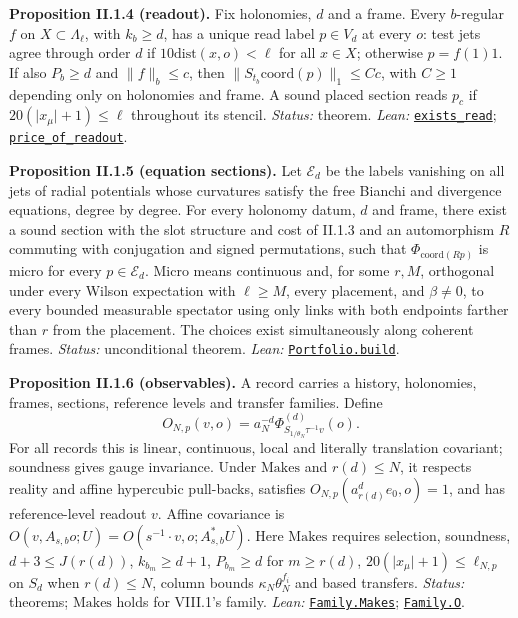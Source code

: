 \documentclass[
  letterpaper,
  11pt]{article}
\begin{document}
\textbf{Proposition II.1.4 (readout).} Fix holonomies, \(d\) and a
frame. Every \(b\)-regular \(f\) on \(X\subset\Lambda_\ell\), with
\(k_b\ge d\), has a unique read label \(p\in V_d\) at every \(o\): test
jets agree through order \(d\) if \(10\mathrm{dist}(x,o)<\ell\) for all
\(x\in X\); otherwise \(p=f(1)1\). If also \(P_b\ge d\) and
\(\lVert f\rVert_b\le c\), then
\(\lVert S_{t_b}\mathrm{coord}(p)\rVert_1\le Cc\), with \(C\ge1\)
depending only on holonomies and frame. A sound placed section reads
\(p_c\) if \(20(\lvert x_\mu\rvert+1)\le\ell\) throughout its stencil.
\emph{Status:} theorem. \emph{Lean:}
\href{https://github.com/yang-mills-group/OpenAI-YM-20261028/blob/3456e5e75cf8d4cd558955a5c7638fba2d68f464/YM/Next/FOUNDATIONS/Readout.lean\#L238-L247}{\texttt{exists\_read}};
\href{https://github.com/yang-mills-group/OpenAI-YM-20261028/blob/3456e5e75cf8d4cd558955a5c7638fba2d68f464/YM/Next/FOUNDATIONS/TestBounds.lean\#L271-L290}{\texttt{price\_of\_readout}}.

\textbf{Proposition II.1.5 (equation sections).} Let \(\mathcal E_d\) be
the labels vanishing on all jets of radial potentials whose curvatures
satisfy the free Bianchi and divergence equations, degree by degree. For
every holonomy datum, \(d\) and frame, there exist a sound section with
the slot structure and cost of II.1.3 and an automorphism \(R\)
commuting with conjugation and signed permutations, such that
\(\Phi_{\mathrm{coord}(Rp)}\) is micro for every \(p\in\mathcal E_d\).
Micro means continuous and, for some \(r,M\), orthogonal under every
Wilson expectation with \(\ell\ge M\), every placement, and
\(\beta\ne0\), to every bounded measurable spectator using only links
with both endpoints farther than \(r\) from the placement. The choices
exist simultaneously along coherent frames. \emph{Status:} unconditional
theorem. \emph{Lean:}
\href{https://github.com/yang-mills-group/OpenAI-YM-20261028/blob/3456e5e75cf8d4cd558955a5c7638fba2d68f464/YM/Push/RELAY_MARK/Portfolio.lean\#L101-L105}{\texttt{Portfolio.build}}.

\textbf{Proposition II.1.6 (observables).} A record carries a history,
holonomies, frames, sections, reference levels and transfer families.
Define
\[O_{N,p}(v,o)=a_N^{-d}\Phi^{(d)}_{S_{1/\theta_N}\tau^{-1}v}(o).\] For
all records this is linear, continuous, local and literally translation
covariant; soundness gives gauge invariance. Under \(\mathrm{Makes}\)
and \(r(d)\le N\), it respects reality and affine hypercubic pull-backs,
satisfies \(O_{N,p}(a_{r(d)}^de_0,o)=1\), and has reference-level
readout \(v\). Affine covariance is
\(O(v,A_{s,b}o;U)=O(s^{-1}\cdot v,o;A_{s,b}^*U)\). Here
\(\mathrm{Makes}\) requires selection, soundness, \(d+3\le J(r(d))\),
\(k_{b_m}\ge d+1\), \(P_{b_m}\ge d\) for \(m\ge r(d)\),
\(20(\lvert x_\mu\rvert+1)\le\ell_{N,p}\) on \(S_d\) when \(r(d)\le N\),
column bounds \(\kappa_N\theta_N^{f_i}\) and based transfers.
\emph{Status:} theorems; \(\mathrm{Makes}\) holds for VIII.1's family.
\emph{Lean:}
\href{https://github.com/yang-mills-group/OpenAI-YM-20261028/blob/3456e5e75cf8d4cd558955a5c7638fba2d68f464/YM/Source/Construction.lean\#L44-L62}{\texttt{Family.Makes}};
\href{https://github.com/yang-mills-group/OpenAI-YM-20261028/blob/3456e5e75cf8d4cd558955a5c7638fba2d68f464/YM/Source/Construction.lean\#L42}{\texttt{Family.O}}.
\end{document}
